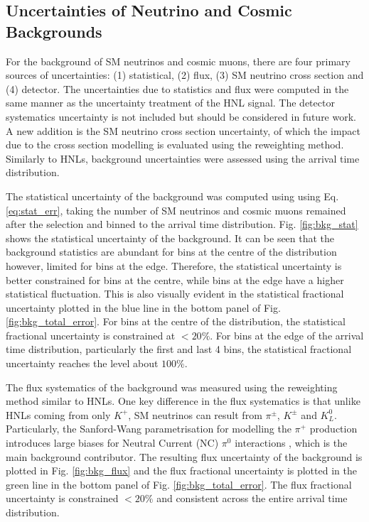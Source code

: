 \subsection{Uncertainties of Neutrino and Cosmic Backgrounds}
\label{sec:bkg_error}

For the background of SM neutrinos and cosmic muons, there are four primary sources of uncertainties: (1) statistical, (2) flux, (3) SM neutrino cross section and (4) detector.
The uncertainties due to statistics and flux were computed in the same manner as the uncertainty treatment of the HNL signal.
The detector systematics uncertainty is not included but should be considered in future work.
A new addition is the SM neutrino cross section uncertainty, of which the impact due to the cross section modelling is evaluated using the reweighting method.
Similarly to HNLs, background uncertainties were assessed using the arrival time distribution.  

The statistical uncertainty of the background was computed using using Eq. \ref{eq:stat_err}, taking the number of SM neutrinos and cosmic muons remained after the selection and binned to the arrival time distribution.
Fig. \ref{fig:bkg_stat} shows the statistical uncertainty of the background.
It can be seen that the background statistics are abundant for bins at the centre of the distribution however, limited for bins at the edge.
Therefore, the statistical uncertainty is better constrained for bins at the centre, while bins at the edge have 
a higher statistical fluctuation.
This is also visually evident in the statistical fractional uncertainty plotted in the blue line in the bottom panel of Fig. \ref{fig:bkg_total_error}.
For bins at the centre of the distribution, the statistical fractional uncertainty is constrained at $< 20\%$.
For bins at the edge of the arrival time distribution, particularly the first and last 4 bins, the statistical fractional uncertainty reaches the level about $100\%$.

The flux systematics of the background was measured using the reweighting method similar to HNLs.
One key difference in the flux systematics is that unlike HNLs coming from only $K^+$, SM neutrinos can result from $\pi^\pm$, $K^\pm$ and $K^0_L$.%
Particularly, the Sanford-Wang parametrisation for modelling the $\pi^+$ production introduces large biases for Neutral Current (NC) $\pi^0$ interactions \cite{EdPhD}, which is the main background contributor.
The resulting flux uncertainty of the background is plotted in Fig. \ref{fig:bkg_flux} and the flux fractional uncertainty is plotted in the green line in the bottom panel of Fig. \ref{fig:bkg_total_error}.
The flux fractional uncertainty is constrained $<20 \%$ and consistent across the entire arrival time distribution.

